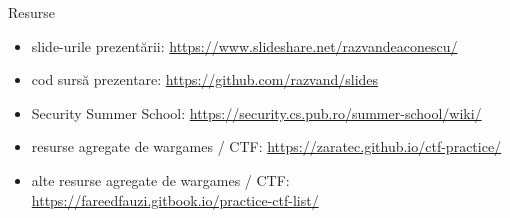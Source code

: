 \documentclass{simple}
\begin{document}
\begin{frame}{Resurse}
  \begin{itemize}
    \item slide-urile prezentării: \url{https://www.slideshare.net/razvandeaconescu/}
    \item cod sursă prezentare: \url{https://github.com/razvand/slides}
    \item Security Summer School: \url{https://security.cs.pub.ro/summer-school/wiki/}
    \item resurse agregate de wargames / CTF: \url{https://zaratec.github.io/ctf-practice/}
    \item alte resurse agregate de wargames / CTF: \url{https://fareedfauzi.gitbook.io/practice-ctf-list/}
  \end{itemize}
\end{frame}
\end{document}
